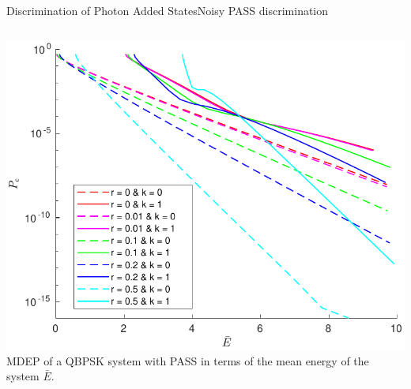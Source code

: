 \begin{frame}{Discrimination of Photon Added States}{Noisy PASS discrimination}
\begin{columns}
        \begin{column}{0.5\linewidth}%
            \begin{center}
                \includegraphics[width=1\textwidth]{Pictures/fig3.7.pdf}\\
                \scriptsize{
                MDEP of a QBPSK system with PASS in terms of the mean energy of the system $\bar{E}$.
                }
            \end{center}
        \end{column}
    \end{columns}
\end{frame}  